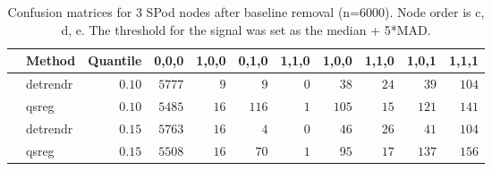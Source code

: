 \begin{table}[!tbp]
\caption{Confusion matrices for 3 SPod nodes after baseline 
      removal (n=6000). Node order is c, d, e. The threshold for the signal was 
      set as the median + 5*MAD.\label{confusion}} 
\begin{center}
\begin{tabular}{llrrrrrrrrr}
\hline\hline
\multicolumn{1}{l}{}&\multicolumn{1}{c}{Method}&\multicolumn{1}{c}{Quantile}&\multicolumn{1}{c}{0,0,0}&\multicolumn{1}{c}{1,0,0}&\multicolumn{1}{c}{0,1,0}&\multicolumn{1}{c}{1,1,0}&\multicolumn{1}{c}{1,0,0}&\multicolumn{1}{c}{1,1,0}&\multicolumn{1}{c}{1,0,1}&\multicolumn{1}{c}{1,1,1}\tabularnewline
\hline
&detrendr&$0.10$&$5777$&$ 9$&$  9$&$0$&$ 38$&$24$&$ 39$&$104$\tabularnewline
&qsreg&$0.10$&$5485$&$16$&$116$&$1$&$105$&$15$&$121$&$141$\tabularnewline
&detrendr&$0.15$&$5763$&$16$&$  4$&$0$&$ 46$&$26$&$ 41$&$104$\tabularnewline
&qsreg&$0.15$&$5508$&$16$&$ 70$&$1$&$ 95$&$17$&$137$&$156$\tabularnewline
\hline
\end{tabular}\end{center}
\end{table}
